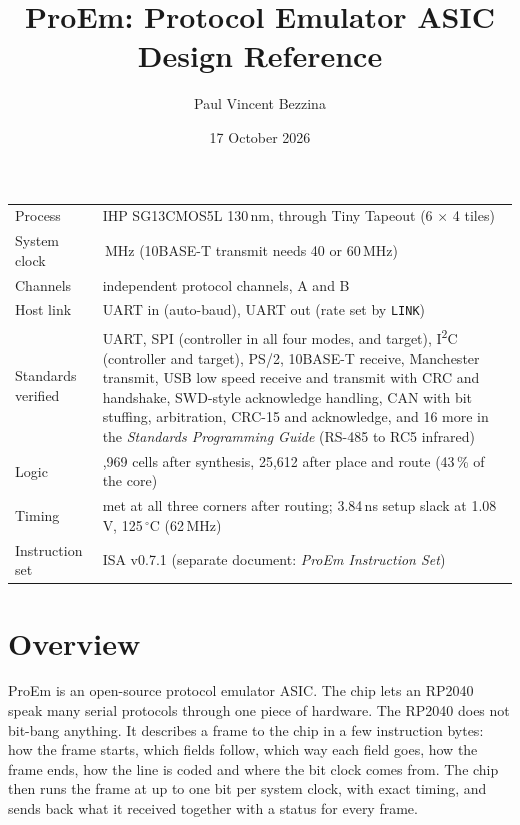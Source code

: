 \documentclass[11pt,a4paper]{article}
\title{ProEm: Protocol Emulator ASIC\\\large Design Reference}
\author{Paul Vincent Bezzina}
\date{17 October 2026}
\newcommand{\sig}[1]{\texttt{#1}}
\begin{document}
\maketitle
\thispagestyle{fancy}

\begin{center}
\begin{tabularx}{\linewidth}{@{}l>{\raggedright\arraybackslash}X@{}}
\toprule
Process & IHP SG13CMOS5L 130\,nm, through Tiny Tapeout (6 $\times$ 4 tiles) \\
System clock & 50\,MHz (10BASE-T transmit needs 40 or 60\,MHz) \\
Channels & 2 independent protocol channels, A and B \\
Host link & UART in (auto-baud), UART out (rate set by \sig{LINK}) \\
Standards verified & UART, SPI (controller in all four modes, and target), I\textsuperscript{2}C (controller and target), PS/2, 10BASE-T receive, Manchester transmit, USB low speed receive and transmit with CRC and handshake, SWD-style acknowledge handling, CAN with bit stuffing, arbitration, CRC-15 and acknowledge, and 16 more in the \emph{Standards Programming Guide} (RS-485 to RC5 infrared) \\
Logic & 18,969 cells after synthesis, 25,612 after place and route (43\,\% of the core) \\
Timing & met at all three corners after routing; 3.84\,ns setup slack at 1.08\,V, 125\,$^\circ$C (62\,MHz) \\
Instruction set & ISA v0.7.1 (separate document: \emph{ProEm Instruction Set}) \\
\bottomrule
\end{tabularx}
\end{center}

\tableofcontents
\newpage

\section{Overview}

ProEm is an open-source protocol emulator ASIC. The chip lets an RP2040 speak many serial protocols through one piece of hardware. The RP2040 does not bit-bang anything. It describes a frame to the chip in a few instruction bytes: how the frame starts, which fields follow, which way each field goes, how the frame ends, how the line is coded and where the bit clock comes from. The chip then runs the frame at up to one bit per system clock, with exact timing, and sends back what it received together with a status for every frame.
\end{document}
